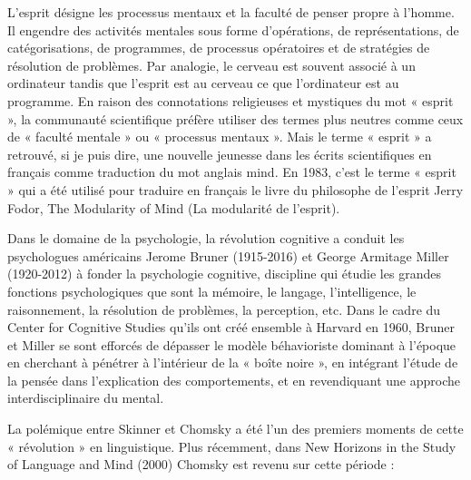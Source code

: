 \noindent{\color{BellaTeal}$\diamond$}\hspace{.6em}L'esprit désigne les processus mentaux et la faculté de penser propre à l’homme. Il engendre des activités mentales sous forme d’opérations, de représentations, de catégorisations, de programmes, de processus opératoires et de stratégies de résolution de problèmes. Par analogie, le cerveau est souvent associé à un ordinateur tandis que l’esprit est au cerveau ce que l'ordinateur est au programme. En raison des connotations religieuses et mystiques du mot « esprit », la communauté scientifique préfère utiliser des termes plus neutres comme ceux de « faculté mentale » ou « processus mentaux ». Mais le terme « esprit » a retrouvé, si je puis dire, une nouvelle jeunesse dans les écrits scientifiques en français comme traduction du mot anglais mind. En 1983, c’est le terme « esprit » qui a été utilisé pour traduire en français le livre du philosophe de l’esprit Jerry Fodor, The Modularity of Mind (La modularité de l'esprit).\par

 Dans le domaine de la psychologie, la révolution cognitive a conduit les psychologues américains Jerome Bruner (1915-2016) et George Armitage Miller (1920-2012) à fonder la psychologie cognitive, discipline qui étudie les grandes fonctions psychologiques que sont la mémoire, le langage, l'intelligence, le raisonnement, la résolution de problèmes, la perception, etc. Dans le cadre du Center for Cognitive Studies qu'ils ont créé ensemble à Harvard en 1960, Bruner et Miller se sont efforcés de dépasser le modèle béhavioriste dominant à l’époque en cherchant à pénétrer à l’intérieur de la « boîte noire », en intégrant l’étude de la pensée dans l’explication des comportements, et en revendiquant une approche interdisciplinaire du mental.\par

 La polémique entre Skinner et Chomsky a été l’un des premiers moments de cette « révolution » en linguistique. Plus récemment, dans New Horizons in the Study of Language and Mind (2000) Chomsky est revenu sur cette période :\par



